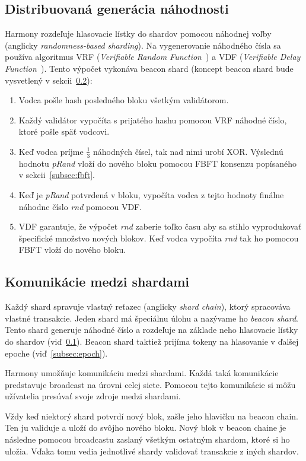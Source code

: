 \subsection{Distribuovaná generácia náhodnosti}\label{subsec:rnd}
Harmony rozdeľuje hlasovacie lístky do shardov pomocou náhodnej voľby (anglicky \textit{randomness-based sharding}). Na vygenerovanie náhodného čísla sa používa algoritmus VRF (\textit{Verifiable Random Function~\cite{algorandGilad}}) a VDF (\textit{Verifiable Delay Function~\cite{vdfBoneh}}). Tento výpočet vykonáva beacon shard (koncept beacon shard bude vysvetlený v sekcii~\ref{subsec:cross-com}):
\begin{enumerate}
	\item Vodca pošle hash posledného bloku všetkým validátorom.
	\item Každý validátor vypočíta s prijatého hashu pomocou VRF náhodné číslo, ktoré pošle späť vodcovi.
	\item Keď vodca príjme $\frac{1}{3}$ náhodných čísel, tak nad nimi urobí XOR. Výslednú hodnotu \textit{pRand} vloží do nového bloku pomocou FBFT konsenzu popísaného v sekcii~\ref{subsec:fbft}.
	\item Keď je \textit{pRand} potvrdená v bloku, vypočíta vodca z tejto hodnoty finálne náhodne číslo \textit{rnd} pomocou VDF.
	\item VDF garantuje, že výpočet \textit{rnd} zaberie toľko času aby sa stihlo vyprodukovať špecifické množstvo nových blokov. Keď vodca vypočíta \textit{rnd} tak ho pomocou FBFT vloží do nového bloku.
\end{enumerate}

\subsection{Komunikácie medzi shardami}\label{subsec:cross-com}
Každý shard spravuje vlastný reťazec (anglicky \textit{shard chain}), ktorý spracováva vlastné transakcie. Jeden shard má špeciálnu úlohu a nazývame ho \textit{beacon shard}. Tento shard generuje náhodné číslo a rozdeľuje na základe neho hlasovacie lístky do shardov (viď~\ref{subsec:rnd}). Beacon shard taktiež prijíma tokeny na hlasovanie v ďalšej epoche (viď~\ref{subsec:epoch}).

Harmony umožňuje komunikáciu medzi shardami. Každá taká komunikácie predstavuje broadcast na úrovni celej siete. Pomocou tejto komunikácie si môžu užívatelia presúvať svoje zdroje medzi shardami. 

Vždy keď niektorý shard potvrdí nový blok, zašle jeho hlavičku na beacon chain. Ten ju validuje a uloží do svôjho nového bloku. Nový blok v beacon chaine je následne pomocou broadcastu zaslaný všetkým ostatným shardom, ktoré si ho uložia. Vďaka tomu vedia jednotlivé shardy validovať transakcie z iných shardov.

